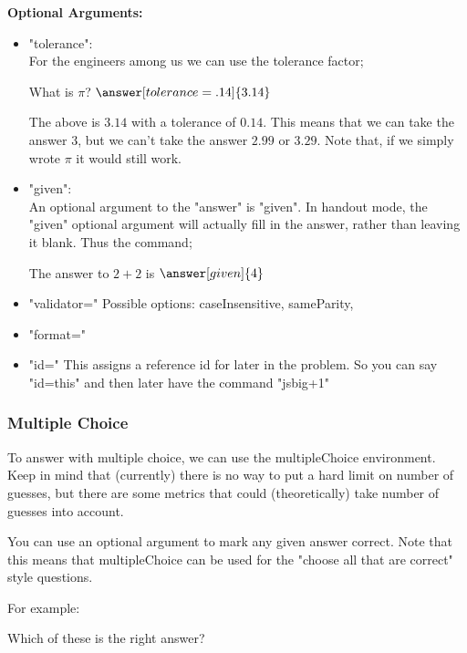 \documentclass{ximera}
\begin{document}
\textbf{Optional Arguments:}

\begin{itemize}
\item "tolerance":\\
For the engineers among us we can use the tolerance factor;
\begin{problem}
What is $\pi$?
$\answer[tolerance=.14]{3.14}$
\end{problem}
The above is $3.14$ with a tolerance of $0.14$. This means that we can take the answer 3, but we can't take the answer $2.99$ or $3.29$. Note that, if we simply wrote $\pi$ it would still work.


\item "given":\\
An optional argument to the "answer" is "given". In handout mode, the "given" optional argument will actually fill in the answer, rather than leaving it blank. Thus the command;

\begin{question}
The answer to $2 + 2$ is $\answer[given]{4}$
\end{question}

\item "validator="
Possible options: caseInsensitive, sameParity, 

\item "format="

\item "id="
This assigns a reference id for later in the problem. So you can say "id=this" and then later have the command "js{big+1}"


\end{itemize}

\subsubsection{Multiple Choice}
To answer with multiple choice, we can use the multipleChoice environment. Keep in mind that (currently) there is no way to put a hard limit on number of guesses, but there are some metrics that could (theoretically) take number of guesses into account. 

You can use an optional argument to mark any given answer correct. Note that this means that multipleChoice can be used for the "choose all that are correct" style questions.

For example:
\begin{problem}
Which of these is the right answer?
\begin{multipleChoice}
\end{multipleChoice}
\end{problem}
\end{document}
